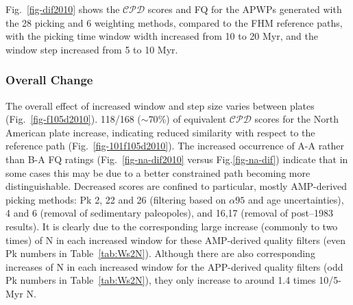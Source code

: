 Fig.~\ref{fig-dif2010} shows the $\mathcal{CPD}$ scores and FQ for the APWPs
generated with the 28 picking and 6 weighting methods, compared to the FHM
reference paths, with the picking time window width increased from 10 to 20 Myr,
and the window step increased from 5 to 10 Myr.

\subsubsection{Overall Change}

The overall effect of increased window and step size varies between plates
(Fig.~\ref{fig-f105d2010}). 118/168 (${\sim}70$\%) of equivalent $\mathcal{CPD}$
scores for the North American plate increase, indicating reduced similarity with
respect to the reference path (Fig.~\ref{fig-101f105d2010}). The increased
occurrence of A-A rather than B-A FQ ratings (Fig.~\ref{fig-na-dif2010} versus
Fig.\ref{fig-na-dif}) indicate that in some cases this may be due to a better
constrained path becoming more distinguishable. Decreased scores are confined to
particular, mostly AMP-derived picking methods: Pk 2, 22 and 26 (filtering based
on ${\alpha}95$ and age uncertainties), 4 and 6 (removal of sedimentary
paleopoles), and 16,17 (removal of post–1983 results). It is clearly due to the
corresponding large increase (commonly to two times) of N in each increased
window for these AMP-derived quality filters (even Pk numbers in
Table~\ref{tab:Ws2N}). Although there are also corresponding increases of N in
each increased window for the APP-derived quality filters (odd Pk numbers in
Table~\ref{tab:Ws2N}), they only increase to around 1.4 times 10/5-Myr N.

